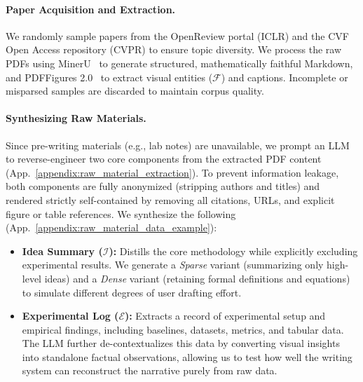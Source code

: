 \paragraph{Paper Acquisition and Extraction.}
We randomly sample papers from the OpenReview portal (ICLR) and the CVF Open Access repository (CVPR) to ensure topic diversity. We process the raw PDFs using MinerU~\citep{wang2024mineruopensourcesolutionprecise} to generate structured, mathematically faithful Markdown, and PDFFigures 2.0~\citep{pdffigures2} to extract visual entities ($\mathcal{F}$) and captions. Incomplete or misparsed samples are discarded to maintain corpus quality.

\paragraph{Synthesizing Raw Materials.}
Since pre-writing materials (e.g., lab notes) are unavailable, we prompt an LLM to reverse-engineer two core components from the extracted PDF content (App.~\ref{appendix:raw_material_extraction}). To prevent information leakage, both components are fully anonymized (stripping authors and titles) and rendered strictly self-contained by removing all citations, URLs, and explicit figure or table references. We synthesize the following (App.~\ref{appendix:raw_material_data_example}):
\begin{itemize}
    \item \textbf{Idea Summary ($\mathcal{I}$):} Distills the core methodology while explicitly excluding experimental results. We generate a \textit{Sparse} variant (summarizing only high-level ideas) and a \textit{Dense} variant (retaining formal definitions and \mylatex{} equations) to simulate different degrees of user drafting effort.
    \item \textbf{Experimental Log ($\mathcal{E}$):} Extracts a record of experimental setup and empirical findings, including baselines, datasets, metrics, and tabular data. The LLM further de-contextualizes this data by converting visual insights into standalone factual observations, allowing us to test how well the writing system can reconstruct the narrative purely from raw data.
\end{itemize}
